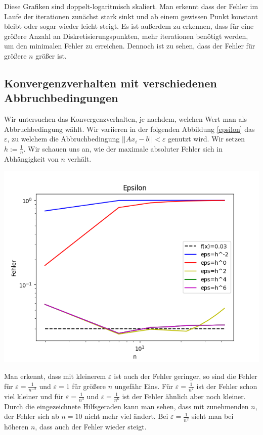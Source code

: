 \documentclass[smallheadings]{scrartcl}
\theoremstyle{definition}
\begin{document}
 Diese Grafiken sind doppelt-logaritmisch skaliert.  Man erkennt dass der Fehler im Laufe der iterationen zunächst stark sinkt und ab einem gewissen Punkt konstant bleibt oder sogar wieder leicht steigt.  Es ist außerdem zu erkennen, dass für eine größere Anzahl an Diskretisierungspunkten, mehr iterationen benötigt werden, um den minimalen Fehler zu erreichen. Dennoch ist zu sehen, dass der Fehler für größere $n$ größer ist. 


\subsection{Konvergenzverhalten mit verschiedenen Abbruchbedingungen}
Wir untersuchen das Konvergenzverhalten, je nachdem, welchen Wert man als Abbruchbedingung wählt.  Wir variieren in der folgenden Abbildung \ref{epsilon} das $\varepsilon$,  zu welchem die Abbruchbedingung $||Ax_i -b||<\varepsilon$ genutzt wird. Wir setzen $h:=\frac{1}{n}$. Wir schauen uns an, wie der maximale absoluter Fehler sich in Abhängigkeit von $n$ verhält. 


\begin{minipage}{\textwidth}

 \centering
 \includegraphics[scale = 0.9]{epsilon1}
 	\label{epsilon}

 \end{minipage}
 
 Man erkennt, dass mit kleinerem $\varepsilon$ ist auch der Fehler geringer, so sind die Fehler für $\varepsilon =\frac{1}{n^{-2}}$ und $\varepsilon =1$ für größere $n$ ungefähr Eins.    Für $\varepsilon =\frac{1}{n^{2}}$ ist der Fehler schon viel kleiner und für  $\varepsilon =\frac{1}{n^{4}}$ und  $\varepsilon =\frac{1}{n^{6}}$ ist der Fehler ähnlich aber noch kleiner.  Durch die eingezeichnete Hilfsgeraden kann man sehen, dass mit zunehmenden $n$, der Fehler sich ab $n=10$ nicht mehr viel ändert.  Bei $\varepsilon = \frac{1}{n^{2}}$ sieht man bei höheren $n$, dass auch der Fehler wieder steigt.
\end{document}
